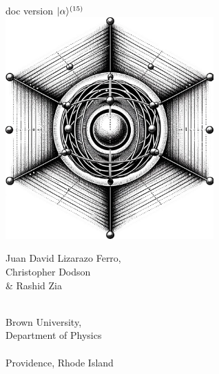 \documentclass[11pt, twoside,openright]{article}
\begin{document}
 

\begin{titlepage} %
    \centering
    \vspace*{\fill}
    
    {\Large\qlanth}\\
    {\large doc version $|\alpha\rangle^{(15)}$} \\
    \vspace*{0.5cm}
    \includegraphics[width=0.6\textwidth]{ion_in_lattice.jpg}  %
    \vspace*{0.4cm} %
    
    {\large Juan David Lizarazo Ferro,}\\
    {\large Christopher Dodson}\\
    {\large \& Rashid Zia}\\
    
	\vspace*{\fill}
\end{titlepage}

\newpage

\thispagestyle{empty}
\vspace*{\fill}
\begin{center}
$\,$ \\
{\large Brown University, \\ Department of Physics}\\
\vspace{0.2cm}
\hrulefill \\
\vspace{0.2cm}
Providence, Rhode Island \\
\end{center}
\end{document}
